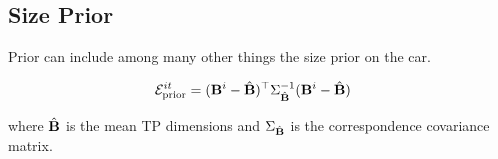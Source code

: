 \subsection{Size Prior}

Prior can include among many other things the size prior on the car.

\begin{align}
  \label{eq:totalSizeEnergy}
  \mathcal{E}^{it}_{\text{prior}} &= (\mathbf{B}^{i} - \hat{\mathbf{B}})^\top\Sigma_{\hat{\mathbf{B}}}^{-1}(\mathbf{B}^{i} -
  \hat{\mathbf{B}})
\end{align}

where $\hat{\mathbf{B}}$ is the mean TP dimensions and
$\Sigma_{\hat{\mathbf{B}}}$ is the correspondence covariance matrix.
